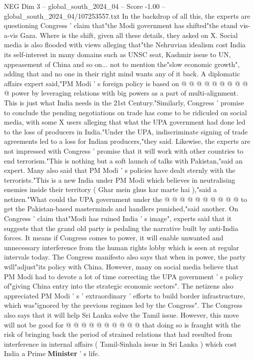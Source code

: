\begin{textsample}{NEG Dim 3 – global\_south\_2024\_04 – Score -1.00 – global\_south\_2024\_04/107253557.txt}
In the backdrop of all this, the experts are questioning Congress ' claim that"the Modi government has shifted"the stand vis-a-vis Gaza.
Where is the shift, given all these details, they asked on X.
Social media is also flooded with views alleging that"the Nehruvian idealism cost India its self-interest in many domains such as UNSC seat, Kashmir issue to UN, appeasement of China and so on... not to mention the"slow economic growth", adding that and no one in their right mind wants any of it back.
A diplomatic affairs expert said,"PM Modi ' s foreign policy is based on @ @ @ @ @ @ @ @ @ @ power by leveraging relations with big powers as a part of multi-alignment.
This is just what India needs in the 21st Century."Similarly, Congress ' promise to conclude the pending negotiations on trade has come to be ridiculed on social media, with some X users alleging that what the UPA government had done led to the loss of producers in India."Under the UPA, indiscriminate signing of trade agreements led to a loss for Indian producers,"they said.
Likewise, the experts are not impressed with Congress ' promise that it will work with other countries to end terrorism."This is nothing but a soft launch of talks with Pakistan,"said an expert.
Many also said that PM Modi ' s policies have dealt sternly with the terrorists."This is a new India under PM Modi which believes in neutralising enemies inside their territory ( Ghar mein ghus kar marte hai ),"said a netizen."What could the UPA government under the @ @ @ @ @ @ @ @ @ @ to get the Pakistan-based masterminds and handlers punished,"said another.
On Congress ' claim that"Modi has ruined India ' s image", experts said that it suggests that the grand old party is pedaling the narrative built by anti-India forces.
It means if Congress comes to power, it will enable unwanted and unnecessary interference from the human rights lobby which is seen at regular intervals today.
The Congress manifesto also says that when in power, the party will"adjust"its policy with China.
However, many on social media believe that PM Modi had to devote a lot of time correcting the UPA government ' s policy of"giving China entry into the strategic economic sectors".
The netizens also appreciated PM Modi ' s ' extraordinary ' efforts to build border infrastructure, which was"ignored by the previous regimes led by the Congress".
The Congress also says that it will help Sri Lanka solve the Tamil issue.
However, this move will not be good for @ @ @ @ @ @ @ @ @ @ that doing so is fraught with the risk of bringing back the period of strained relations that had resulted from interference in internal affairs ( Tamil-Sinhala issue in Sri Lanka ) which cost India a Prime \textbf{Minister} ' s life.

\end{textsample}
